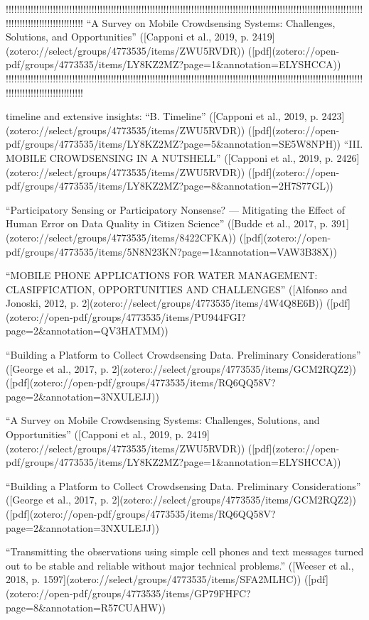 {!!!!!!!!!!!!!!!!!!!!!!!!!!!!!!!!!!!!!!!!!!!!!!!!!!!!!!!!!!!!!!!!!!!!!!!!!!!!!!!!!!!!!!!!!!!!!!!!!!!!!!!!!!!!!!!!!!!!!!!!!!!!!!!!!!!!!!!!!!!!!!!!!!!!!!!!!!!!!
“A Survey on Mobile Crowdsensing Systems: Challenges, Solutions, and Opportunities” ([Capponi et al., 2019, p. 2419](zotero://select/groups/4773535/items/ZWU5RVDR)) ([pdf](zotero://open-pdf/groups/4773535/items/LY8KZ2MZ?page=1&annotation=ELYSHCCA))
!!!!!!!!!!!!!!!!!!!!!!!!!!!!!!!!!!!!!!!!!!!!!!!!!!!!!!!!!!!!!!!!!!!!!!!!!!!!!!!!!!!!!!!!!!!!!!!!!!!!!!!!!!!!!!!!!!!!!!!!!!!!!!!!!!!!!!!!!!!!!!!!!!!!!!!!!!!!!

timeline and extensive insights:
“B. Timeline” ([Capponi et al., 2019, p. 2423](zotero://select/groups/4773535/items/ZWU5RVDR)) ([pdf](zotero://open-pdf/groups/4773535/items/LY8KZ2MZ?page=5&annotation=SE5W8NPH))
“III. MOBILE CROWDSENSING IN A NUTSHELL” ([Capponi et al., 2019, p. 2426](zotero://select/groups/4773535/items/ZWU5RVDR)) ([pdf](zotero://open-pdf/groups/4773535/items/LY8KZ2MZ?page=8&annotation=2H7S77GL))

“Participatory Sensing or Participatory Nonsense? — Mitigating the Effect of Human Error on Data Quality in Citizen Science” ([Budde et al., 2017, p. 391](zotero://select/groups/4773535/items/8422CFKA)) ([pdf](zotero://open-pdf/groups/4773535/items/5N8N23KN?page=1&annotation=VAW3B38X))

“MOBILE PHONE APPLICATIONS FOR WATER MANAGEMENT: CLASIFFICATION, OPPORTUNITIES AND CHALLENGES” ([Alfonso and Jonoski, 2012, p. 2](zotero://select/groups/4773535/items/4W4Q8E6B)) ([pdf](zotero://open-pdf/groups/4773535/items/PU944FGI?page=2&annotation=QV3HATMM))

“Building a Platform to Collect Crowdsensing Data. Preliminary Considerations” ([George et al., 2017, p. 2](zotero://select/groups/4773535/items/GCM2RQZ2)) ([pdf](zotero://open-pdf/groups/4773535/items/RQ6QQ58V?page=2&annotation=3NXULEJJ))

“A Survey on Mobile Crowdsensing Systems: Challenges, Solutions, and Opportunities” ([Capponi et al., 2019, p. 2419](zotero://select/groups/4773535/items/ZWU5RVDR)) ([pdf](zotero://open-pdf/groups/4773535/items/LY8KZ2MZ?page=1&annotation=ELYSHCCA))

“Building a Platform to Collect Crowdsensing Data. Preliminary Considerations” ([George et al., 2017, p. 2](zotero://select/groups/4773535/items/GCM2RQZ2)) ([pdf](zotero://open-pdf/groups/4773535/items/RQ6QQ58V?page=2&annotation=3NXULEJJ))

“Transmitting the observations using simple cell phones and text messages turned out to be stable and reliable without major technical problems.” ([Weeser et al., 2018, p. 1597](zotero://select/groups/4773535/items/SFA2MLHC)) ([pdf](zotero://open-pdf/groups/4773535/items/GP79FHFC?page=8&annotation=R57CUAHW))

}
